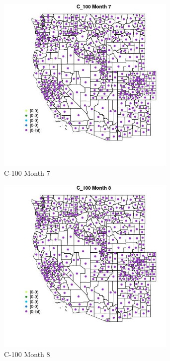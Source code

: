 \begin{figure} 
\centering  
\includegraphics[width=0.77\textwidth]{Code_Outputs/df_report_ML_predictors_CountyCentroid_Locations_Dates_2008-01-01to2018-12-31_MapObsMo7C_100.jpg} 
\caption{\label{fig:df_report_ML_predictors_CountyCentroid_Locations_Dates_2008-01-01to2018-12-31MapObsMo7C_100}C-100 Month 7} 
\end{figure} 
 

\begin{figure} 
\centering  
\includegraphics[width=0.77\textwidth]{Code_Outputs/df_report_ML_predictors_CountyCentroid_Locations_Dates_2008-01-01to2018-12-31_MapObsMo8C_100.jpg} 
\caption{\label{fig:df_report_ML_predictors_CountyCentroid_Locations_Dates_2008-01-01to2018-12-31MapObsMo8C_100}C-100 Month 8} 
\end{figure} 
 


